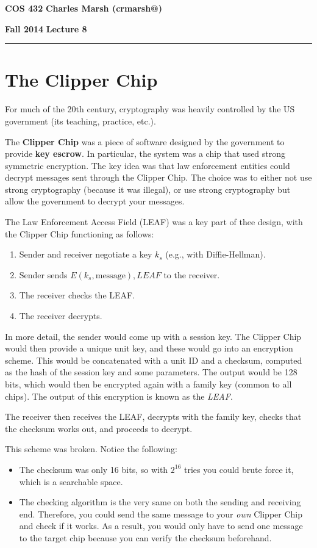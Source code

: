 \documentclass[12pt]{article}
\makeatletter
\newcommand{\myheader}[4]
{\vspace*{-0.5in}
\noindent
{#1} \hfill {#3}

\noindent
{#2} \hfill {#4}

\noindent
\rule[8pt]{\textwidth}{1pt}

\vspace{1ex} 
}  %
\newcommand{\myalgsheader}[0]
{\myheader
{ {\bf{COS 432}} }
{ {\bf{Fall 2014}} }
{ {\bf{Charles Marsh (crmarsh@)}} }
{ {\bf{Lecture 8}} }
}
\makeatother
\begin{document}
\myalgsheader

\pagestyle{plain}

\section*{The Clipper Chip}

For much of the 20th century, cryptography was heavily controlled by the US government (its teaching, practice, etc.).

The \textbf{Clipper Chip} was a piece of software designed by the government to provide \textbf{key escrow}. In particular, the system was a chip that used strong symmetric encryption. The key idea was that law enforcement entities could decrypt messages sent through the Clipper Chip. The choice was to either not use strong cryptography (because it was illegal), or use strong cryptography but allow the government to decrypt your messages.

The Law Enforcement Access Field (LEAF) was a key part of thee design, with the Clipper Chip functioning as follows:
\begin{enumerate}
\item Sender and receiver negotiate a key $k_s$ (e.g., with Diffie-Hellman).
\item Sender sends $E(k_s, \text{message}), LEAF$ to the receiver.
\item The receiver checks the LEAF.
\item The receiver decrypts.
\end{enumerate}

In more detail, the sender would come up with a session key. The Clipper Chip would then provide a unique unit key, and these would go into an encryption scheme. This would be concatenated with a unit ID and a checksum, computed as the hash of the session key and some parameters. The output would be 128 bits, which would then be encrypted again with a family key (common to all chips). The output of this encryption is known as the \textit{LEAF}.

The receiver then receives the LEAF, decrypts with the family key, checks that the checksum works out, and proceeds to decrypt.

This scheme was broken. Notice the following:
\begin{itemize}
\item The checksum was only 16 bits, so with $2^{16}$ tries you could brute force it, which is a searchable space.
\item The checking algorithm is the very same on both the sending and receiving end. Therefore, you could send the same message to your \textit{own} Clipper Chip and check if it works. As a result, you would only have to send one message to the target chip because you can verify the checksum beforehand.
\end{itemize}
\end{document}
